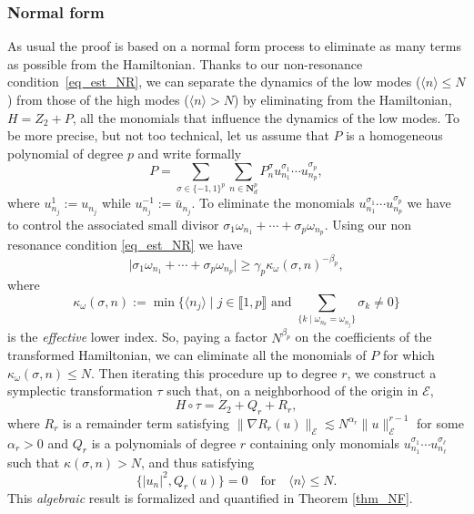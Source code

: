 \documentclass[JEP,XML,SOM,Unicode,NoEqCountersInSection,published]{cedram}
\let\ts\textstyle
\theoremstyle{definition}
\begin{document}
\label{subsec_scheme}

\subsubsection*{Normal form} As usual the proof is based on a normal form process to eliminate as many terms as possible from the Hamiltonian. Thanks to our non-resonance condition~\eqref{eq_est_NR}, we can separate the dynamics of the low modes ($\langle n\rangle\leq N$) from those of the high modes ($\langle n\rangle> N$)
by eliminating from the Hamiltonian, $H=Z_2+P$, all the monomials that influence the dynamics of the low modes. To be more precise, but not too technical, let us assume that $P$ is a homogeneous polynomial of degree $p$ and write formally
\[
P=\sum_{\sigma\in\{-1,1\}^p}\sum_{n\in \mathbf{N}^p_d } P^\sigma_n u_{n_1}^{\sigma_1}\cdots u_{n_p}^{\sigma_p},
\]
where $u_{n_j}^{1}:=u_{n_j}$ while $u_{n_j}^{-1}:=\bar u_{n_j}$.
To eliminate the monomials $u_{n_1}^{\sigma_1}\cdots u_{n_p}^{\sigma_p}$ we have to control the associated small divisor
$\sigma_1 \omega_{n_1}+\cdots+\sigma_p \omega_{n_p}$.
Using our non resonance condition \eqref{eq_est_NR} we have
\[
\big| \sigma_1 \omega_{n_1}+\cdots+\sigma_p \omega_{n_p}\big|\geq \gamma_p\kappa_\omega(\sigma,n)^{-\beta_p},
\]
where
\begin{equation}
\label{eq_def_kappa}
\kappa_\omega(\sigma,n):= \min \big\{\langle n_j \rangle \mid j \in \llbracket 1,p \rrbracket \text{ and } \ts\sum_{\{k\mid \omega_{n_k} = \omega_{n_j}\}} \sigma_k \neq 0\big\}
\end{equation}
is the \emph{effective} lower index.
So, paying a factor $N^{\beta_p}$ on the coefficients of the transformed Hamiltonian, we can eliminate all the monomials of $P$ for which $\kappa_\omega(\sigma,n)\leq N$. Then iterating this procedure up to degree $r$, we construct a symplectic transformation $\tau$ such that, on a neighborhood of the origin in ${\mathcal{E}}$,
\[
H\circ \tau =Z_2+Q_r+R_r,
\]
where $R_r$ is a remainder term satisfying $\|\nabla R_r(u)\|_{\mathcal{E}}\lesssim N^{\alpha_r}\|u\|^{r-1}_{\mathcal{E}}$ for some $\alpha_r>0$ and $Q_r$ is a polynomials of degree $r$ containing only monomials $ u_{n_1}^{\sigma_1}\cdots u_{n_\ell}^{\sigma_\ell}$ such that $\kappa(\sigma,n)> N$, and thus satisfying
\[
\{|u_n|^2,Q_r(u)\}=0
\quad \mathrm{for} \quad
\langle n \rangle \leq N.
\]
This \emph{algebraic} result is formalized and quantified in Theorem \ref{thm_NF}.
\end{document}
